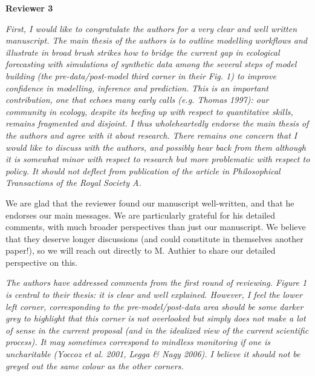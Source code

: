 \documentclass[11pt,letter]{article}
\begin{document}
{\bf Reviewer 3} %

\begin{mybox}
\emph{First, I would like to congratulate the authors for a very clear and well written manuscript. The main thesis of the authors is to outline modelling workflows and illustrate in broad brush strikes how to bridge the current gap in ecological forecasting with simulations of synthetic data among the several steps of model building (the pre-data/post-model third corner in their Fig. 1) to improve confidence in modelling, inference and prediction. This is an important contribution, one that echoes many early calls (e.g. Thomas 1997): our community in ecology, despite its beefing up with respect to quantitative skills, remains fragmented and disjoint. I thus wholeheartedly endorse the main thesis of the authors and agree with it about research. There remains one concern that I would like to discuss with the authors, and possibly hear back from them although it is somewhat minor with respect to research but more problematic with respect to policy. It should not deflect from publication of the article in Philosophical Transactions of the Royal Society A.}
\end{mybox}

We are glad that the reviewer found our manuscript well-written, and that he endorses our main messages. We are particularly grateful for his detailed comments, with much broader perspectives than just our manuscript. We believe that they deserve longer discussions (and could constitute in themselves another paper!), so we will reach out directly to M. Authier to share our detailed perspective on this.

\begin{mybox}
\emph{The authors have addressed comments from the first round of reviewing. Figure 1 is central to their thesis: it is clear and well explained. However, I feel the lower left corner, corresponding to the pre-model/post-data area should be some darker grey to highlight that this corner is not overlooked but simply does not make a lot of sense in the current proposal (and in the idealized view of the current scientific process). It may sometimes correspond to mindless monitoring if one is uncharitable (Yoccoz et al. 2001, Legga \& Nagy 2006). I believe it should not be greyed out the same colour as the other corners.}  
\end{mybox}
\end{document}
